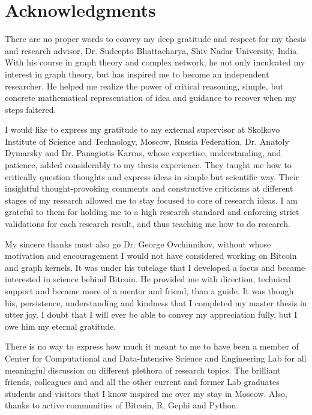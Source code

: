 \chapter*{Acknowledgments}

There are no proper words to convey my deep gratitude and respect for my thesis and research advisor, Dr. Sudeepto Bhattacharya, Shiv Nadar University, India. With his course in graph theory and complex network, he not only inculcated my interest in graph theory, but has inspired me to become an independent researcher. He helped me realize the power of critical reasoning, simple, but concrete mathematical representation of idea and guidance to recover when my steps faltered.

I would like to express my gratitude to my  external supervisor at Skolkovo Institute of Science and Technology, Moscow, Russia Federation,  Dr. Anatoly Dymarsky and Dr. Panagiotis Karras,  whose expertise, understanding, and patience, added considerably to my thesis experience. They taught me how to critically question thoughts and express ideas in simple but scientific way. Their insightful thought-provoking comments and constructive criticisms at different stages of my research allowed me to stay focused to core of research ideas. I am grateful to them for holding me to a high research standard and enforcing strict validations for each research result, and thus teaching me how to do research.

My sincere thanks must also go Dr. George Ovchinnikov, without whose motivation and encouragement I would not have considered working on Bitcoin and graph kernels. It was under his tutelage that I developed a focus and became interested in science behind Bitcoin. He provided me with direction, technical support and became more of a mentor and friend, than a guide. It was though his, persistence, understanding and kindness that I completed my master thesis in utter joy. I doubt that I will ever be able to convey my appreciation fully, but I owe him my eternal gratitude.

There is no way to express how much it meant to me to have been a member of Center for Computational and Data-Intensive Science and Engineering Lab for all meaningful discussion on different plethora  of research topics. The brilliant friends, colleagues and and all the other current and former Lab graduates students and visitors that I know inspired me over my stay in Moscow. Also, thanks to active communities of Bitcoin, R, Gephi and Python.


